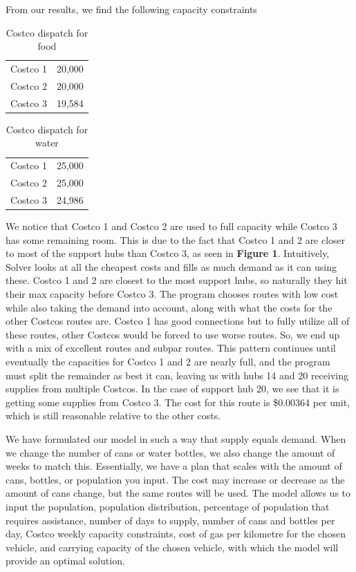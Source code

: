 \documentclass{article}
\begin{document}
From our results, we find the following capacity constraints

\begin{table}[!h]
    \centering
    \begin{tabular}{c|c}
    Costco 1     & 20,000\\
        Costco 2 & 20,000 \\
        Costco 3 & 19,584
    \end{tabular}
    \caption{ Costco dispatch for food}
\end{table}

\begin{table}[!h]
    \centering
    \begin{tabular}{c|c}
    Costco 1     & 25,000\\
        Costco 2 & 25,000 \\
        Costco 3 & 24,986
    \end{tabular}
    \caption{Costco dispatch for water}
    \label{tab:my_label}
\end{table}

We notice that Costco 1 and Costco 2 are used to full capacity while Costco 3 has some remaining room. This is due to the fact that Costco 1 and 2 are closer to most of the support hubs than Costco 3, as seen in \textbf{Figure 1}. Intuitively, Solver looks at all the cheapest costs and fills as much demand as it can using these. Costco 1 and 2 are closest to the most support hubs, so naturally they hit their max capacity before Costco 3. The program chooses routes with low cost while also taking the demand into account, along with what the costs for the other Costcos routes are. Costco 1 has good connections but to fully utilize all of these routes, other Costcos would be forced to use worse routes. So, we end up with a mix of excellent routes and subpar routes. This pattern continues until eventually the capacities for Costco 1 and 2 are nearly full, and the program must split the remainder as best it can, leaving us with hubs 14 and 20 receiving supplies from multiple Costcos. In the case of support hub 20, we see that it is getting some supplies from Costco 3. The cost for this route is \$0.00364 per unit, which is still reasonable relative to the other costs.

We have formulated our model in such a way that supply equals demand. When we change the number of cans or water bottles, we also change the amount of weeks to match this. Essentially, we have a plan that scales with the amount of cans, bottles, or population you input. The cost may increase or decrease as the amount of cans change, but the same routes will be used. The model allows us to input the population, population distribution, percentage of population that requires assistance, number of days to supply, number of cans and bottles per day, Costco weekly capacity constraints, cost of gas per kilometre for the chosen vehicle, and carrying capacity of the chosen vehicle, with which the model will provide an optimal solution.
\end{document}
